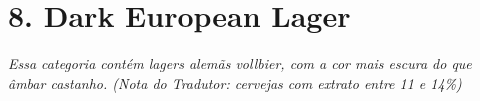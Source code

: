 \section*{8. Dark European Lager}
\textit{Essa categoria contém lagers alemãs vollbier, com a cor mais escura do que âmbar castanho. (Nota do Tradutor: cervejas com extrato entre 11 e 14\%)}
